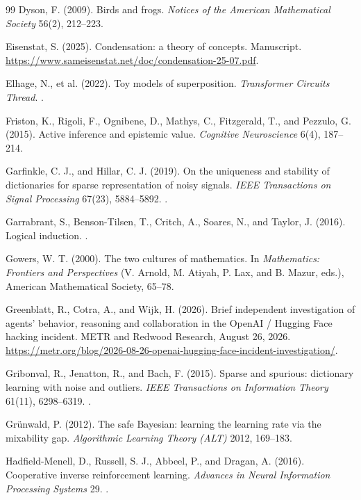 \begin{thebibliography}{99}
 Dyson, F. (2009). Birds and frogs. \emph{Notices of the American Mathematical Society} 56(2), 212--223.



 Eisenstat, S. (2025). Condensation: a theory of concepts. Manuscript. \url{https://www.sameisenstat.net/doc/condensation-25-07.pdf}.

 Elhage, N., et al. (2022). Toy models of superposition. \emph{Transformer Circuits Thread}. .





 Friston, K., Rigoli, F., Ognibene, D., Mathys, C., Fitzgerald, T., and Pezzulo, G. (2015). Active inference and epistemic value. \emph{Cognitive Neuroscience} 6(4), 187--214.

 Garfinkle, C. J., and Hillar, C. J. (2019). On the uniqueness and stability of dictionaries for sparse representation of noisy signals. \emph{IEEE Transactions on Signal Processing} 67(23), 5884--5892. .

 Garrabrant, S., Benson-Tilsen, T., Critch, A., Soares, N., and Taylor, J. (2016). Logical induction. .

 Gowers, W. T. (2000). The two cultures of mathematics. In \emph{Mathematics: Frontiers and Perspectives} (V. Arnold, M. Atiyah, P. Lax, and B. Mazur, eds.), American Mathematical Society, 65--78.

 Greenblatt, R., Cotra, A., and Wijk, H. (2026). Brief independent investigation of agents' behavior, reasoning and collaboration in the OpenAI / Hugging Face hacking incident. METR and Redwood Research, August 26, 2026. \url{https://metr.org/blog/2026-08-26-openai-hugging-face-incident-investigation/}.

 Gribonval, R., Jenatton, R., and Bach, F. (2015). Sparse and spurious: dictionary learning with noise and outliers. \emph{IEEE Transactions on Information Theory} 61(11), 6298--6319. .

 Gr\"unwald, P. (2012). The safe Bayesian: learning the learning rate via the mixability gap. \emph{Algorithmic Learning Theory (ALT)} 2012, 169--183.





 Hadfield-Menell, D., Russell, S. J., Abbeel, P., and Dragan, A. (2016). Cooperative inverse reinforcement learning. \emph{Advances in Neural Information Processing Systems} 29. .


\end{thebibliography}
